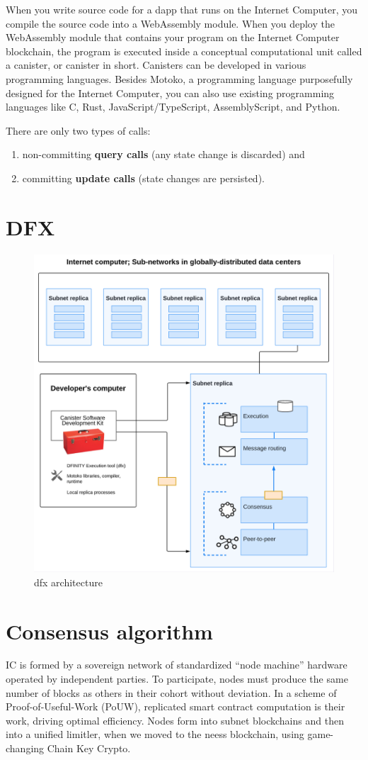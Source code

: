When you write source code for a dapp that runs on the Internet Computer, you compile the source code into a WebAssembly module. When you deploy the WebAssembly module that contains your program on the Internet Computer blockchain, the program is executed inside a conceptual computational unit called a canister, or canister in short. Canisters can be developed in various programming languages. Besides Motoko, a programming language purposefully designed for the Internet Computer, you can also use existing programming languages like C, Rust, JavaScript/TypeScript, AssemblyScript, and Python.

There are only two types of calls:

\begin{enumerate}
  \item non-committing \textbf{query calls} (any state change is discarded) and
  \item committing \textbf{update calls} (state changes are persisted).
\end{enumerate}

\section{DFX}

\begin{figure}
	\centering
	\includegraphics[width=.5\linewidth]{figures/dfx.png}
	\caption{dfx architecture}
	\label{fig:dfx}
\end{figure}


\section{Consensus algorithm}

IC is formed by a sovereign network of standardized ``node machine'' hardware operated by independent parties. To participate, nodes 
must produce the same number of blocks as others in their cohort without deviation. In a scheme of Proof-of-Useful-Work (PoUW), 
replicated smart contract computation is their work, driving optimal efficiency. Nodes form into subnet blockchains and then into a 
unified limitler, when we moved to the neess blockchain, using game-changing Chain Key Crypto.

